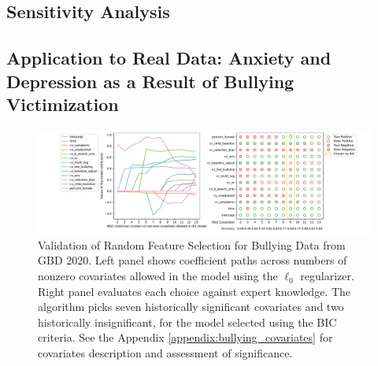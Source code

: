 \begin{table}[ht]
\centering
\resizebox{\columnwidth}{!}{}

\caption{\label{table:glmmlasso} Comparison of performance of MSR3-Fast for $\ell_1$ regularizer vs \texttt{glmmLasso}. MSR3-Fast executes 5 times faster in wall time and has higher accuracy of selecting correct covariates. 
}
\end{table}

\subsection{Sensitivity Analysis}
\label{ch:msr3_sensitivity_analysis}


\subsection{Application to Real Data: Anxiety and Depression as a Result of Bullying Victimization}
\label{sec:real}

\begin{figure}
    \centering
	\caption{\label{fig:bullying_data_random_feature_selection}Validation of Random Feature Selection for Bullying Data from GBD 2020. 
	Left panel shows coefficient paths across numbers of nonzero covariates allowed in the model using the $\ell_0$ regularizer. 
	Right panel evaluates each choice against expert knowledge. 
	The algorithm picks seven historically significant covariates and two historically insignificant, for the model selected using the BIC criteria. 
	See the Appendix \ref{appendix:bullying_covariates} for covariates description and assessment of significance.}
	\includegraphics[width=1\textwidth]{figures/bullying_data_assessment_selection}
\end{figure}

